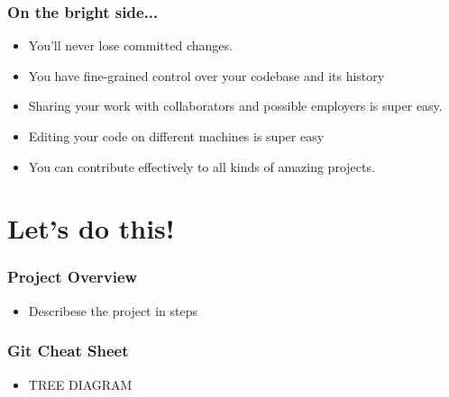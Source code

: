 \documentclass[unknownkeysallowed]{beamer}
\begin{document}
\begin{frame}
    \frametitle{On the bright side...}
    \begin{itemize}
        \item{You'll never lose committed changes.}
        \item{You have fine-grained control over your codebase and its history}
        \item{Sharing your work with collaborators and possible employers is super easy.}
        \item{Editing your code on different machines is super easy}
        \item{You can contribute effectively to all kinds of amazing projects.}
    \end{itemize}
    \vspace{1cm} %
\end{frame}

\section{Let's do this!}
\begin{frame}
    \frametitle{Project Overview}
    \begin{itemize}
        \item{Describese the project in steps}
    \end{itemize}
    \vspace{1cm} %
\end{frame}

\begin{frame}
    \frametitle{Git Cheat Sheet}
    \begin{itemize}
        \item{TREE DIAGRAM}
    \end{itemize}
    \vspace{1cm} %
\end{frame}
\end{document}

